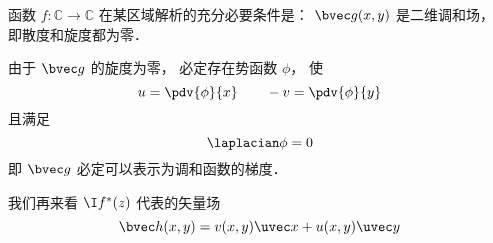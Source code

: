 \begin{theorem}{}
函数 $f:\mathbb C\to\mathbb C$ 在某区域解析的充分必要条件是： $\bvec g(x,y)$ 是二维调和场， 即散度和旋度都为零．
\end{theorem}
由于 $\bvec g$ 的旋度为零， 必定存在势函数 $\phi$， 使
\begin{equation}
u = \pdv{\phi}{x} \qquad -v = \pdv{\phi}{y}
\end{equation}
且满足
\begin{equation}
\laplacian \phi = 0
\end{equation}
即 $\bvec g$ 必定可以表示为调和函数的梯度．

我们再来看 $\I f^*(z)$ 代表的矢量场
\begin{equation}
\bvec h(x,y) = v(x,y)\uvec x + u(x,y)\uvec y
\end{equation}
